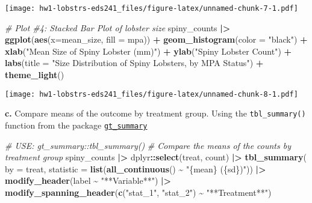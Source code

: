 \documentclass[
]{article}
\newenvironment{Shaded}{\begin{snugshade}}{\end{snugshade}}
\newcommand{\AttributeTok}[1]{\textcolor[rgb]{0.13,0.29,0.53}{#1}}
\newcommand{\CommentTok}[1]{\textcolor[rgb]{0.56,0.35,0.01}{\textit{#1}}}
\newcommand{\FunctionTok}[1]{\textcolor[rgb]{0.13,0.29,0.53}{\textbf{#1}}}
\newcommand{\NormalTok}[1]{#1}
\newcommand{\SpecialCharTok}[1]{\textcolor[rgb]{0.81,0.36,0.00}{\textbf{#1}}}
\newcommand{\StringTok}[1]{\textcolor[rgb]{0.31,0.60,0.02}{#1}}
\begin{document}
\texttt{[image: hw1-lobstrs-eds241\_files/figure-latex/unnamed-chunk-7-1.pdf]}

\begin{Shaded}
\begin{Highlighting}[]
\CommentTok{\# Plot \#4: Stacked Bar Plot of lobster size}
\NormalTok{spiny\_counts }\SpecialCharTok{|\textgreater{}}
    \FunctionTok{ggplot}\NormalTok{(}\FunctionTok{aes}\NormalTok{(}\AttributeTok{x=}\NormalTok{mean\_size, }\AttributeTok{fill =}\NormalTok{ mpa)) }\SpecialCharTok{+}
    \FunctionTok{geom\_histogram}\NormalTok{(}\AttributeTok{color =} \StringTok{"black"}\NormalTok{) }\SpecialCharTok{+}
    \FunctionTok{xlab}\NormalTok{(}\StringTok{"Mean Size of Spiny Lobster (mm)"}\NormalTok{) }\SpecialCharTok{+}
    \FunctionTok{ylab}\NormalTok{(}\StringTok{"Spiny Lobster Count"}\NormalTok{) }\SpecialCharTok{+}
    \FunctionTok{labs}\NormalTok{(}\AttributeTok{title =} \StringTok{"Size Distribution of Spiny Lobsters, by MPA Status"}\NormalTok{) }\SpecialCharTok{+}
    \FunctionTok{theme\_light}\NormalTok{()}
\end{Highlighting}
\end{Shaded}

\texttt{[image: hw1-lobstrs-eds241\_files/figure-latex/unnamed-chunk-8-1.pdf]}

\textbf{c.} Compare means of the outcome by treatment group. Using the
\texttt{tbl\_summary()} function from the package
\href{https://www.danieldsjoberg.com/gtsummary/articles/tbl_summary.html}{\texttt{gt\_summary}}

\begin{Shaded}
\begin{Highlighting}[]
\CommentTok{\# USE: gt\_summary::tbl\_summary()}
\CommentTok{\# Compare the means of the counts by treatment group}
\NormalTok{spiny\_counts }\SpecialCharTok{|\textgreater{}} 
\NormalTok{    dplyr}\SpecialCharTok{::}\FunctionTok{select}\NormalTok{(treat, count) }\SpecialCharTok{|\textgreater{}}
    \FunctionTok{tbl\_summary}\NormalTok{(}
        \AttributeTok{by =}\NormalTok{ treat,}
        \AttributeTok{statistic =} \FunctionTok{list}\NormalTok{(}\FunctionTok{all\_continuous}\NormalTok{() }\SpecialCharTok{\textasciitilde{}} \StringTok{"\{mean\} (\{sd\})"}\NormalTok{)) }\SpecialCharTok{|\textgreater{}} 
    \FunctionTok{modify\_header}\NormalTok{(label }\SpecialCharTok{\textasciitilde{}} \StringTok{"**Variable**"}\NormalTok{) }\SpecialCharTok{|\textgreater{}}
    \FunctionTok{modify\_spanning\_header}\NormalTok{(}\FunctionTok{c}\NormalTok{(}\StringTok{"stat\_1"}\NormalTok{, }\StringTok{"stat\_2"}\NormalTok{) }\SpecialCharTok{\textasciitilde{}} \StringTok{"**Treatment**"}\NormalTok{) }
\end{Highlighting}
\end{Shaded}
\end{document}

